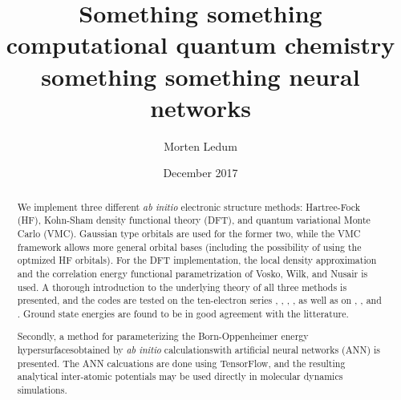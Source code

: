 \documentclass[twoside,english]{uiofysmaster}
\author{Morten Ledum}
\title{Something something computational quantum chemistry something something neural networks}
\date{December 2017}
\begin{document}
\newcommand{\mainfile}{}
\maketitle

\begin{abstract}
We implement three different \emph{ab initio} electronic structure methods: Hartree-Fock (HF), Kohn-Sham density functional theory (DFT), and quantum variational Monte Carlo (VMC). Gaussian type orbitals are used for the former two, while the VMC framework allows more general orbital bases (including the possibility of using the optmized HF orbitals). For the DFT implementation, the local density approximation and the correlation energy functional parametrization of Vosko, Wilk, and Nusair is used. A thorough introduction to the underlying theory of all three methods is presented, and the codes are tested on the ten-electron series , , , , as well as on , , and . Ground state energies are found to be in good agreement with the litterature. 

Secondly, a method for parameterizing the Born-Oppenheimer energy hypersurfaces\textemdash obtained by \emph{ab initio} calculations\textemdash with artificial neural networks (ANN) is presented. The ANN calcuations are done using TensorFlow, and the resulting analytical inter-atomic potentials may be used directly in molecular dynamics simulations.
\end{abstract}


\end{document}
